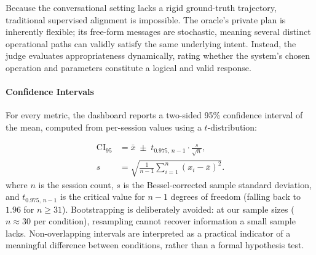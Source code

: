 Because the conversational setting lacks a rigid ground-truth trajectory, traditional supervised alignment is impossible. 
The oracle's private plan is inherently flexible; its free-form messages are stochastic, meaning several distinct operational paths can validly satisfy the same underlying intent.
Instead, the judge evaluates appropriateness dynamically, rating whether the system's chosen operation and parameters constitute a logical and valid response.

\paragraph{Confidence Intervals} For every metric, the dashboard reports a two-sided 95\% confidence interval of the mean, computed from per-session values using a $t$-distribution:

\begin{equation}
\begin{aligned}
  \text{CI}_{95} &= \bar{x} \;\pm\; t_{0.975,\,n-1}\cdot \frac{s}{\sqrt{n}}, \\
  s &= \sqrt{\tfrac{1}{n-1}\textstyle\sum_{i=1}^{n}\left(x_i-\bar{x}\right)^2}.
\end{aligned}
  \label{eq:ci}
\end{equation}
where $n$ is the session count, $s$ is the Bessel-corrected sample standard deviation, and $t_{0.975,\,n-1}$ is the critical value for $n-1$ degrees of freedom (falling back to $1.96$ for $n \geq 31$).
Bootstrapping is deliberately avoided: at our sample sizes ($n \approx 30$ per condition), resampling cannot recover information a small sample lacks.
Non-overlapping intervals are interpreted as a practical indicator of a meaningful difference between conditions, rather than a formal hypothesis test.
